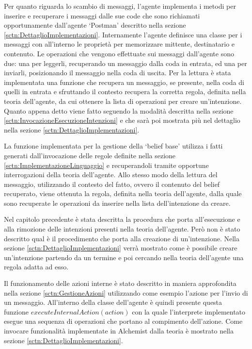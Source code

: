 Per quanto riguarda lo scambio di messaggi, l'agente implementa i metodi per inserire e recuperare i messaggi dalle sue code che sono richiamati opportunamente dall'agente `Postman' descritto nella sezione \ref{sctn:DettaglioImplementazioni}.
Internamente l'agente definisce una classe per i messaggi con all'interno le proprietà per memorizzare mittente, destinatario e contenuto.
Le operazioni che vengono effettuate sui messaggi dall'agente sono due: una per leggerli, recuperando un messaggio dalla coda in entrata, ed una per inviarli, posizionando il messaggio nella coda di uscita.
Per la lettura è stata implementata una funzione che recupera un messaggio, se presente, nella coda di quelli in entrata e sfruttando il contesto recupera la corretta regola, definita nella teoria dell'agente, da cui ottenere la lista di operazioni per creare un'intenzione. Quanto appena detto viene fatto seguendo la modalità descritta nella sezione \ref{sctn:InvocazioneEsecuzioneIntenzioni} e che sarà poi mostrata più nel dettaglio nella sezione \ref{sctn:DettaglioImplementazioni}.

La funzione implementata per la gestione della `belief base' utilizza i fatti generati dall'invocazione delle regole definite nella sezione \ref{sctn:ImplementazioneLinguaggio} e recuperandoli tramite opportune interrogazioni della teoria dell'agente. Allo stesso modo della lettura del messaggio, utilizzando il contesto del fatto, ovvero il contenuto del belief recuperato, viene ottenuta la regola, definita nella teoria dell'agente, dalla quale sono recuperate le operazioni da inserire nella lista dell'intenzione da creare.

Nel capitolo precedente è stata descritta la procedura che porta all'esecuzione e alla rimozione delle intenzioni presenti nella teoria dell'agente. Però non è stato descritto qual è il procedimento che porta alla creazione di un'intenzione.
Nella sezione \ref{sctn:DettaglioImplementazioni} verrà mostrato come è possibile creare un'intenzione partendo da un termine e poi cercando nella teoria dell'agente una regola adatta ad esso.

Il funzionamento delle azioni interne è stato descritto in maniera approfondita nella sezione \ref{sctn:GestioneAzioni} utilizzando come esempio l'azione per l'invio di un messaggio. All'interno della classe dell'agente è quindi presente questa funzione $executeInternalAction(action)$ con la quale l'interprete implementato esegue una sequenza di operazioni che portano al compimento dell'azione. Come invocare funzionalità implementate in Alchemist dalla teoria è mostrato nella sezione \ref{sctn:DettaglioImplementazioni}.

